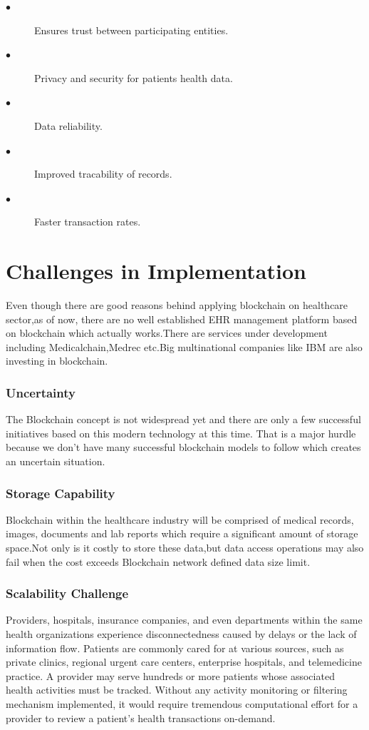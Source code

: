 \documentclass[12pt]{report}
\begin{document}
\begin{description}
\item[$\bullet$]Ensures trust between participating entities.
\item[$\bullet$]Privacy and security for patients health data.
\item[$\bullet$]Data reliability.
\item[$\bullet$]Improved tracability of records.
\item[$\bullet$]Faster transaction rates.
\end{description}

\chapter{Challenges in Implementation}
Even though there are good reasons behind applying blockchain on healthcare sector,as of now, there are no well established EHR management platform based on blockchain which actually works.There are services under development including Medicalchain,Medrec etc.Big multinational companies like IBM are also investing in blockchain.

\subsection{Uncertainty}
The Blockchain concept is not widespread yet and there are only a few successful initiatives based on this modern technology at this time. That is a major hurdle because we don’t have many successful blockchain models to follow which creates an uncertain situation.
\subsection{Storage Capability}
Blockchain within the healthcare industry will be comprised of medical records, images, documents and lab reports which require a significant amount of storage space.Not only is it costly to store these data,but data access operations may also fail when the cost exceeds Blockchain network defined
data size limit.
\subsection{Scalability Challenge}
Providers, hospitals, insurance companies, and even departments within the same health organizations experience disconnectedness
caused by delays or the lack of information flow. Patients are commonly cared for at various
sources, such as private clinics, regional urgent care centers, enterprise hospitals, and telemedicine practice. A provider may serve hundreds or more patients whose associated health
activities must be tracked. Without any activity monitoring or filtering mechanism implemented, it would require tremendous computational effort for a provider to review a patient’s
health transactions on-demand.
\end{document}
